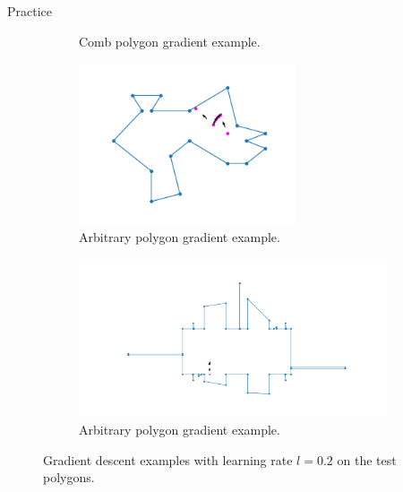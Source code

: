 \documentclass{beamer}
\begin{document}
\begin{frame}{Practice}
\begin{figure}[h!]
\begin{subfigure}{0.45\textwidth}
			\caption{Comb polygon gradient example.}
			\label{fig:comb_gradient}
		\end{subfigure}
		\begin{subfigure}{0.45\textwidth}
			\centering
			\includegraphics[width = 0.7\textwidth]{Images/random_gradient.png}
			\caption{Arbitrary polygon gradient example.}
			\label{fig:random_gradient}
		\end{subfigure}
		\begin{subfigure}{\textwidth}
			\centering
			\includegraphics[width = \textwidth]{Images/love_gradient.png}
			\caption{Arbitrary polygon gradient example.}
			\label{fig:love_gradient}
		\end{subfigure}
		\caption{Gradient descent examples with learning rate $l = 0.2$ on the test polygons.}
		\label{fig:gradients}
	\end{figure}
\end{frame}
\end{document}
